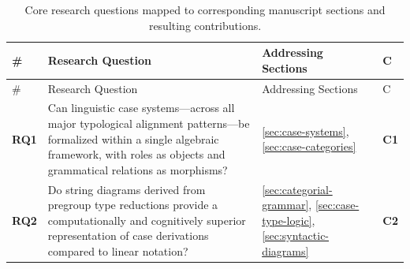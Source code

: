 \documentclass[
]{article}
\begin{document}
\begin{longtable}[]{@{}
  >{\centering\arraybackslash}p{}
  >{\raggedright\arraybackslash}p{}
  >{\raggedright\arraybackslash}p{}
  >{\centering\arraybackslash}p{}@{}}
\caption{Core research questions mapped to corresponding manuscript
sections and resulting
contributions.}\label{tbl:research-questions}\tabularnewline
\toprule\noalign{}
\begin{minipage}[b]{\linewidth}\centering
\#
\end{minipage} & \begin{minipage}[b]{\linewidth}\raggedright
Research Question
\end{minipage} & \begin{minipage}[b]{\linewidth}\raggedright
Addressing Sections
\end{minipage} & \begin{minipage}[b]{\linewidth}\centering
C
\end{minipage} \\
\midrule\noalign{}
\endfirsthead
\toprule\noalign{}
\begin{minipage}[b]{\linewidth}\centering
\#
\end{minipage} & \begin{minipage}[b]{\linewidth}\raggedright
Research Question
\end{minipage} & \begin{minipage}[b]{\linewidth}\raggedright
Addressing Sections
\end{minipage} & \begin{minipage}[b]{\linewidth}\centering
C
\end{minipage} \\
\midrule\noalign{}
\endhead
\bottomrule\noalign{}
\endlastfoot
\textbf{RQ1} & Can linguistic case systems---across all major
typological alignment patterns---be formalized within a single algebraic
framework, with roles as objects and grammatical relations as morphisms?
& \autoref{sec:case-systems}, \autoref{sec:case-categories} &
\textbf{C1} \\
\textbf{RQ2} & Do string diagrams derived from pregroup type reductions
provide a computationally and cognitively superior representation of
case derivations compared to linear notation? &
\autoref{sec:categorial-grammar}, \autoref{sec:case-type-logic},
\autoref{sec:syntactic-diagrams} & \textbf{C2} \\

\end{longtable}
\end{document}
